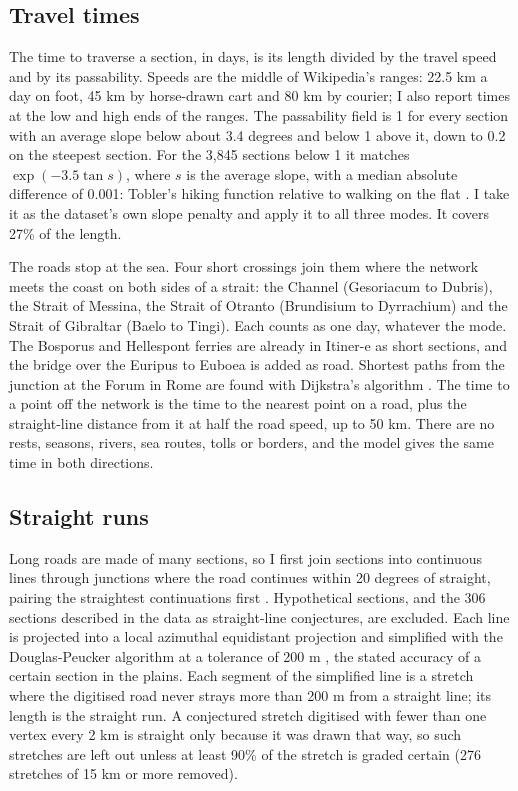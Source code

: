 \documentclass[11pt,a4paper]{article}
\begin{document}
\subsection{Travel times}\label{sec:travel}
The time to traverse a section, in days, is its length divided by the travel speed and by its passability. Speeds are the middle of Wikipedia's ranges: 22.5 km a day on foot, 45 km by horse-drawn cart and 80 km by courier; I also report times at the low and high ends of the ranges. The passability field is 1 for every section with an average slope below about 3.4 degrees and below 1 above it, down to 0.2 on the steepest section. For the 3,845 sections below 1 it matches $\exp(-3.5\tan s)$, where $s$ is the average slope, with a median absolute difference of 0.001: Tobler's hiking function relative to walking on the flat \citep{tobler1993}. I take it as the dataset's own slope penalty and apply it to all three modes. It covers 27\% of the length.

The roads stop at the sea. Four short crossings join them where the network meets the coast on both sides of a strait: the Channel (Gesoriacum to Dubris), the Strait of Messina, the Strait of Otranto (Brundisium to Dyrrachium) and the Strait of Gibraltar (Baelo to Tingi). Each counts as one day, whatever the mode. The Bosporus and Hellespont ferries are already in Itiner-e as short sections, and the bridge over the Euripus to Euboea is added as road. Shortest paths from the junction at the Forum in Rome are found with Dijkstra's algorithm \citep{dijkstra1959}. The time to a point off the network is the time to the nearest point on a road, plus the straight-line distance from it at half the road speed, up to 50 km. There are no rests, seasons, rivers, sea routes, tolls or borders, and the model gives the same time in both directions.

\subsection{Straight runs}
Long roads are made of many sections, so I first join sections into continuous lines through junctions where the road continues within 20 degrees of straight, pairing the straightest continuations first \citep{thomson1999}. Hypothetical sections, and the 306 sections described in the data as straight-line conjectures, are excluded. Each line is projected into a local azimuthal equidistant projection and simplified with the Douglas-Peucker algorithm at a tolerance of 200 m \citep{douglas1973}, the stated accuracy of a certain section in the plains. Each segment of the simplified line is a stretch where the digitised road never strays more than 200 m from a straight line; its length is the straight run. A conjectured stretch digitised with fewer than one vertex every 2 km is straight only because it was drawn that way, so such stretches are left out unless at least 90\% of the stretch is graded certain (276 stretches of 15 km or more removed).
\end{document}
